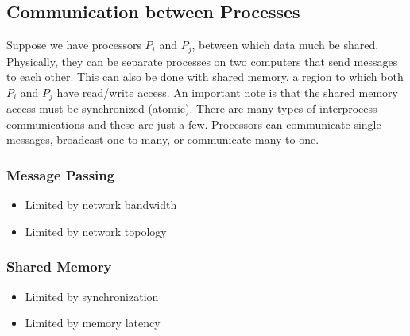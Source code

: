 \documentclass[letterpaper, 12pt]{math}
\begin{document}
\subsection*{Communication between Processes}
Suppose we have processors \( P_i \) and \( P_j \), between which data much be
shared. Physically, they can be separate processes on two computers that send
messages to each other. This can also be done with shared memory, a region to
which both \( P_i \) and \( P_j \) have read/write access. An important note
is that the shared memory access must be synchronized (atomic). There are many
types of interprocess communications and these are just a few. Processors can
communicate single messages, broadcast one-to-many, or communicate many-to-one.
\subsubsection*{Message Passing}
\begin{itemize}
  \item Limited by network bandwidth
  \item Limited by network topology
\end{itemize}
\subsubsection*{Shared Memory}
\begin{itemize}
  \item Limited by synchronization
  \item Limited by memory latency
\end{itemize}
\end{document}
